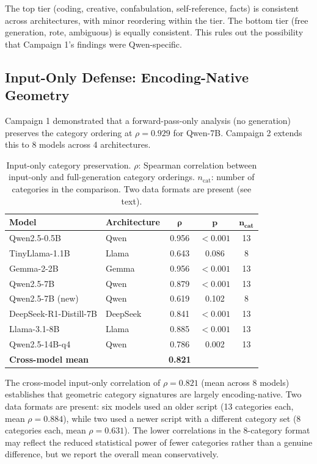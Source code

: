 \documentclass[11pt,a4paper]{article}
\begin{document}
The top tier (coding, creative, confabulation, self-reference, facts) is consistent across architectures, with minor reordering within the tier. The bottom tier (free generation, rote, ambiguous) is equally consistent. This rules out the possibility that Campaign 1's findings were Qwen-specific.

\subsection{Input-Only Defense: Encoding-Native Geometry}
\label{sec:input_only}

Campaign 1 demonstrated that a forward-pass-only analysis (no generation) preserves the category ordering at $\rho = 0.929$ for Qwen-7B. Campaign 2 extends this to 8 models across 4 architectures.

\begin{table}[H]
\centering
\caption{Input-only category preservation. $\rho$: Spearman correlation between input-only and full-generation category orderings. $n_{\text{cat}}$: number of categories in the comparison. Two data formats are present (see text).}
\label{tab:input_only}
\begin{tabular}{llccc}
\toprule
\textbf{Model} & \textbf{Architecture} & $\bm{\rho}$ & $\bm{p}$ & $\bm{n_{\text{cat}}}$ \\
\midrule
Qwen2.5-0.5B & Qwen & 0.956 & $< 0.001$ & 13 \\
TinyLlama-1.1B & Llama & 0.643 & 0.086 & 8 \\
Gemma-2-2B & Gemma & 0.956 & $< 0.001$ & 13 \\
Qwen2.5-7B & Qwen & 0.879 & $< 0.001$ & 13 \\
Qwen2.5-7B (new) & Qwen & 0.619 & 0.102 & 8 \\
DeepSeek-R1-Distill-7B & DeepSeek & 0.841 & $< 0.001$ & 13 \\
Llama-3.1-8B & Llama & 0.885 & $< 0.001$ & 13 \\
Qwen2.5-14B-q4 & Qwen & 0.786 & 0.002 & 13 \\
\midrule
\textbf{Cross-model mean} & & \textbf{0.821} & & \\
\bottomrule
\end{tabular}
\end{table}

The cross-model input-only correlation of $\rho = 0.821$ (mean across 8 models) establishes that geometric category signatures are largely encoding-native. Two data formats are present: six models used an older script (13 categories each, mean $\rho = 0.884$), while two used a newer script with a different category set (8 categories each, mean $\rho = 0.631$). The lower correlations in the 8-category format may reflect the reduced statistical power of fewer categories rather than a genuine difference, but we report the overall mean conservatively.
\end{document}
